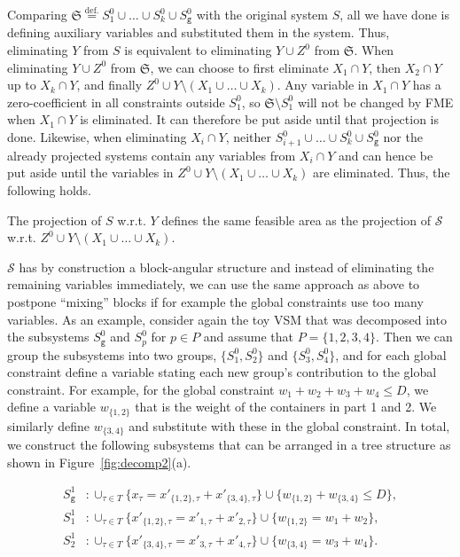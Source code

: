 \documentclass{llncs}
\newcommand{\trt}[1]{\texttt{#1}}
\begin{document}
Comparing $\mathfrak{S} \overset{\text{def.}}{=} S_1^0\cup\ldots\cup S_k^0\cup S_\trt{g}^0$ with the original system $S$, all we have done is defining auxiliary variables and substituted them in the system. Thus, eliminating $Y$ from $S$ is equivalent to eliminating $Y \cup Z^0$ from $\mathfrak{S}$. 
%
When eliminating $Y\cup Z^0$ from $\mathfrak{S}$, we can choose to first eliminate $X_1\cap Y$, then $X_2\cap Y$ up to $X_k\cap Y$, and finally $Z^0\cup Y\setminus(X_1\cup \ldots\cup X_k)$. 
Any variable in $X_1\cap Y$ has a zero-coefficient in all constraints outside $S^0_1$, so $\mathfrak{S}\setminus S^0_1$ will not be changed by FME when $X_1\cap Y$ is eliminated. It can therefore be put aside until that projection is done. 
Likewise, when eliminating $X_i\cap Y$, neither $S_{i+1}^0\cup \ldots \cup S_k^0\cup S_\trt{g}^0$ nor the already projected systems contain any variables from $X_i\cap Y$ and can hence be put aside until the variables in $Z^0\cup Y\setminus(X_1\cup \ldots\cup X_k)$ are eliminated. Thus, the following holds. 
%
\begin{proposition}
The projection of $S$ w.r.t. $Y$ defines the same feasible area as 
the projection of $\mathcal{S}$ w.r.t. $Z^0 \cup Y\setminus (X_1\cup \ldots \cup X_k)$. 
\end{proposition}
%
$\mathcal{S}$ has by construction a block-angular structure and instead of eliminating the remaining variables immediately, we can use the same approach as above to postpone ``mixing'' blocks if for example the global constraints use too many variables. 
As an example, consider again the toy VSM that was decomposed into the subsystems $S^0_\trt{g}$ and $S^0_p$ for $p\in P$ and assume that $P=\{1,2,3,4\}$. Then we can group the subsystems into two groups, $\{S^0_1, S^0_2\}$ and $\{S^0_3, S^0_4\}$, and for each global constraint define a variable stating each new group's contribution to the global constraint. For example, for the global constraint $w_1 + w_2 + w_3 + w_4 \leq D$, we define a variable $w_{\{1,2\}}$ that is the weight of the containers in part 1 and 2. We similarly define $w_{\{3,4\}}$ and substitute with these in the global constraint. In total, we construct the following subsystems that can be arranged in a tree structure as shown in Figure~\ref{fig:decomp2}(a).
\begin{footnotesize}
\begin{align*}
S_\trt{g}^1 &:\cup_{\tau\in T}\{ x_\tau = x'_{\{1,2\},\tau} + x'_{\{3,4\},\tau}\} \cup \{ w_{\{1,2\}} + w_{\{3,4\}} \leq D \},\\   
S^1_1				&:\cup_{\tau\in T}\{ x'_{\{1,2\},\tau} = x'_{1,\tau} + x'_{2,\tau}\}\cup \{ w_{\{1,2\}} = w_{1} + w_{2}\},\\
S^1_2				&:\cup_{\tau\in T}\{ x'_{\{3,4\},\tau} = x'_{3,\tau} + x'_{4,\tau}\} \cup \{ w_{\{3,4\}} = w_{3} + w_{4}\}. 
\end{align*}
\end{footnotesize}
\end{document}
